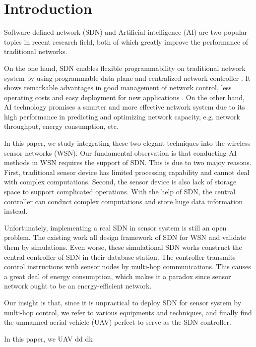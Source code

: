 \section{Introduction}



 
 Software defined network (SDN) and Artificial intelligence (AI) 
 are two popular topics in recent research field, 
 both of which greatly improve the performance of traditional
 networks.
 
On the one hand, SDN enables flexible 
programmability on traditional network system 
by using programmable data plane and centralized network controller \cite{}.
It shows remarkable advantages in good management of network control, 
less operating costs and easy deployment for new applications \cite{}.
On the other hand, AI technology promises a smarter and more effective network system
due to its high performance in predicting and optimizing network capacity,
e.g. network throughput, energy consumption, etc.

In this paper, we study integrating these two elegant techniques into 
the wireless sensor networks (WSN). Our fundamental observation is 
that conducting AI methods in WSN requires
the support of SDN. This is due to two majoy reasons. 
First, traditional sensor device 
has limited processing capability and cannot deal with complex computations.
Second, the sensor device is also lack of storage space 
to support complicated operations. With the help of SDN, 
the central controller can conduct complex computations 
and store huge data information instead.
  
Unfortunately, implementing a real SDN in sensor system 
is still an open problem. The existing work \cite{} 
all design framework of SDN for WSN and validate them by simulations.  
Even worse, these simulational SDN works construct the central controller 
of SDN in their database station. The controller transmits control 
instructions with sensor nodes by multi-hop communications.
This causes a great deal of energy consumption, which 
makes it a paradox since sensor network ought to be an energy-efficient network.

Our insight is that, since it is unpractical to deploy SDN 
for sensor system by multi-hop control,
we refer to various equipments and techniques, 
and finally find the unmanned aerial vehicle (UAV) 
perfect to serve as the SDN controller.
 

In this paper, we 
UAV dd dk

